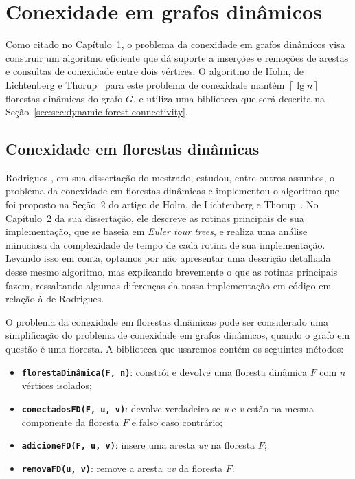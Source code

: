 

\chapter{Conexidade em grafos dinâmicos}

\enlargethispage{.8\baselineskip}

Como citado no Capítulo~1, o problema da conexidade em grafos dinâmicos visa construir um algoritmo eficiente que dá suporte a inserções e remoções de arestas e consultas de conexidade entre dois vértices. O algoritmo de Holm, de Lichtenberg e Thorup~\cite{jacob_holm} para este problema de conexidade mantém $\left\lceil \lg n \right\rceil$ florestas dinâmicas do grafo $G$, e utiliza uma biblioteca que será descrita na Seção~\ref{sec:sec:dynamic-forest-connectivity}. 

\section{Conexidade em florestas dinâmicas}
\label{sec:dynamic-forest-connectivity}

Rodrigues \cite{arthur}, em sua dissertação do mestrado, estudou, entre outros assuntos, o problema da conexidade em florestas dinâmicas e implementou o algoritmo que foi proposto na Seção~2 do artigo de Holm, de Lichtenberg e Thorup~\cite{jacob_holm}. No Capítulo~2 da sua dissertação, ele descreve as rotinas principais de sua implementação, que se baseia em \textit{Euler tour trees}, e realiza uma análise minuciosa da complexidade de tempo de cada rotina de sua implementação. Levando isso em conta, optamos por não apresentar uma descrição detalhada desse mesmo algoritmo, mas explicando brevemente o que as rotinas principais fazem, ressaltando algumas diferenças da nossa implementação em código em relação à de Rodrigues.  

O problema da conexidade em florestas dinâmicas pode ser considerado uma simplificação do problema de conexidade em grafos dinâmicos, quando o grafo em questão é uma floresta. A biblioteca que usaremos contém os seguintes métodos:

\begin{itemize}
    \item \texttt{\textbf{florestaDinâmica(F, n)}}: constrói e devolve uma floresta dinâmica $F$ com $n$ vértices isolados;
    \item \texttt{\textbf{conectadosFD(F, u, v)}}: devolve verdadeiro se \textit{u} e \textit{v} estão na mesma componente da floresta $F$ e falso caso contrário;
    \item \texttt{\textbf{adicioneFD(F, u, v)}}: insere uma aresta \textit{uv} na floresta $F$;
    \item \texttt{\textbf{removaFD(u, v)}}: remove a aresta \textit{uv} da floresta $F$.
\end{itemize}

